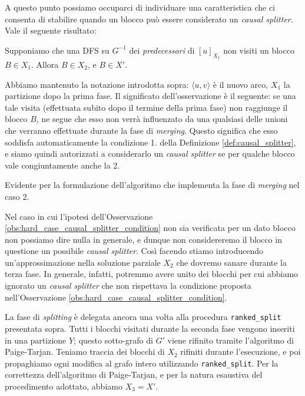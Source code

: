 A questo punto possiamo occuparci di individuare una caratteristica che ci consenta di stabilire quando un blocco può essere considerato un \emph{causal splitter}. Vale il seguente risultato:
\begin{observation}
    \label{obs:hard_case_causal_splitter_condition}
    Supponiamo che una DFS su $G^{-1}$ dei \emph{predecessori} di $[u]_{X_1}$ non visiti un blocco $B \in X_1$. Allora $B \in X_2$, e $B \in X'$.
\end{observation}

Abbiamo mantenuto la notazione introdotta sopra: $\langle u,v \rangle$ è il nuovo arco, $X_1$ la partizione dopo la prima fase. Il significato dell'osservazione è il seguente: se una tale visita (effettuata subito dopo il termine della prima fase) non raggiunge il blocco $B$, ne segue che esso non verrà influenzato da una qualsiasi delle unioni che verranno effettuate durante la fase di \emph{merging}. Questo significa che esso soddisfa automaticamente la condizione 1. della Definizione \ref{def:causal_splitter}, e siamo quindi autorizzati a considerarlo un \emph{causal splitter} se per qualche blocco vale congiuntamente anche la 2.

\begin{proof2}
    Evidente per la formulazione dell'algoritmo che implementa la fase di \emph{merging} nel caso 2.
\end{proof2}

Nel caso in cui l'ipotesi dell'Osservazione \ref{obs:hard_case_causal_splitter_condition} non sia verificata per un dato blocco non possiamo dire nulla in generale, e dunque non considereremo il blocco in questione un possibile \emph{causal splitter}. Così facendo stiamo introducendo un'approssimazione nella soluzione parziale $X_2$ che dovremo sanare durante la terza fase. In generale, infatti, potremmo avere unito dei blocchi per cui abbiamo ignorato un \emph{causal splitter} che non rispettava la condizione proposta nell'Osservazione \ref{obs:hard_case_causal_splitter_condition}.

La fase di \emph{splitting} è delegata ancora una volta alla procedura \texttt{ranked\_split} presentata sopra. Tutti i blocchi visitati durante la seconda fase vengono inseriti in una partizione $Y$; questo sotto-grafo di $G'$ viene rifinito tramite l'algoritmo di Paige-Tarjan. Teniamo traccia dei blocchi di $X_2$ rifiniti durante l'esecuzione, e poi propaghiamo ogni modifica al grafo intero utilizzando \texttt{ranked\_split}. Per la correttezza dell'algoritmo di Paige-Tarjan, e per la natura esaustiva del procedimento adottato, abbiamo $X_3 = X'$.

